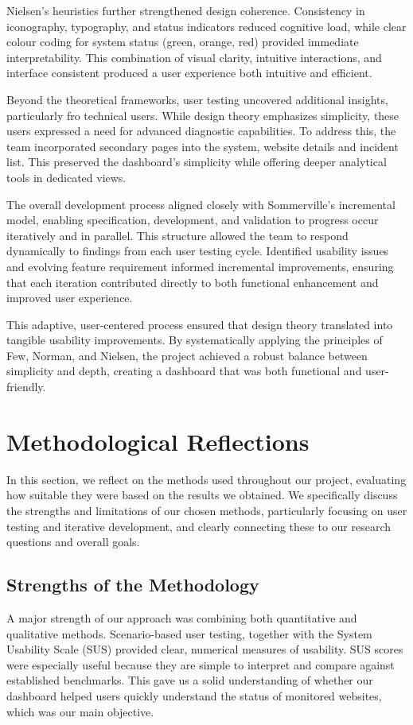Nielsen's heuristics further strengthened design coherence. Consistency in iconography, typography, and status indicators reduced cognitive load, while clear colour coding for system status (green, orange, red) provided immediate interpretability. This combination of visual clarity, intuitive interactions, and interface consistent produced a user experience both intuitive and efficient.

Beyond the theoretical frameworks, user testing uncovered additional insights, particularly fro technical users. While design theory emphasizes simplicity, these users expressed a need for advanced diagnostic capabilities. To address this, the team incorporated secondary pages into the system, website details and incident list. This preserved the dashboard's simplicity while offering deeper analytical tools in dedicated views.

The overall development process aligned closely with Sommerville's incremental model, enabling specification, development, and validation to progress occur iteratively and in parallel. This structure allowed the team to respond dynamically to findings from each user testing cycle. Identified usability issues and evolving feature requirement informed incremental improvements, ensuring that each iteration contributed directly to both functional enhancement and improved user experience. 

This adaptive, user-centered process ensured that design theory translated into tangible usability improvements. By systematically applying the principles of Few, Norman, and Nielsen, the project achieved a robust balance between simplicity and depth, creating a dashboard that was both functional and user-friendly. 









\section{Methodological Reflections}
\label{sec:methodological_reflection}
In this section, we reflect on the methods used throughout our project, evaluating how suitable they were based on the results we obtained. We specifically discuss the strengths and limitations of our chosen methods, particularly focusing on user testing and iterative development, and clearly connecting these to our research questions and overall goals.

\subsection{Strengths of the Methodology}
A major strength of our approach was combining both quantitative and qualitative methods. Scenario-based user testing, together with the System Usability Scale (SUS) provided clear, numerical measures of usability. SUS scores were especially useful because they are simple to interpret and compare against established benchmarks. This gave us a solid understanding of whether our dashboard helped users quickly understand the status of monitored websites, which was our main objective.

